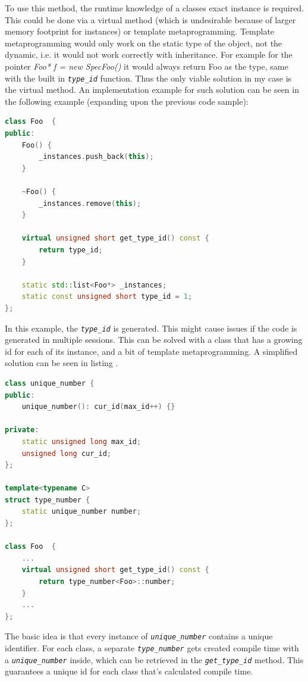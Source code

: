 To use this method, the runtime knowledge of a classes exact instance is
required. This could be done via a virtual method (which is undesirable
because of larger memory footprint for instances) or template metaprogramming.
Template metaprogramming would only work on the static type of the object, not
the dynamic, i.e. it would not work correctly with inheritance. For example for
the pointer \emph{Foo* f = new SpecFoo()} it would always return Foo as the
type, same with the built in \emph{\texttt{type\_id}} function. Thus the only
viable solution in my case is the virtual method. An implementation example for
such solution can be seen in the following example (expanding upon the
previous code sample):

\begin{lstlisting}[frame=single,language=C++, label=listing:type_id,
caption=Type identifier for classes]
class Foo  {
public:
	Foo() {
		_instances.push_back(this);
	}
	
	~Foo() {
		_instances.remove(this);
	}
	
	virtual unsigned short get_type_id() const {
        return type_id;
    }
		
	static std::list<Foo*> _instances;
	static const unsigned short type_id = 1;
};
\end{lstlisting}

In this example, the \emph{\texttt{type\_id}} is generated. This might cause
issues if the code is generated in multiple sessions. This can be solved with a
class that has a growing id for each of its instance, and a bit of template
metaprogramming. A simplified solution can be seen in listing
.

\begin{lstlisting}[frame=single,float=!ht,language=C++,
label=listing:unique_number, caption=Unique number generation for type
identifiers]
class unique_number { 
public:
	unique_number(): cur_id(max_id++) {}

private:
	static unsigned long max_id;
	unsigned long cur_id;
};

template<typename C>
struct type_number {
	static unique_number number;
};

class Foo  {
	...
	virtual unsigned short get_type_id() const {
        return type_number<Foo>::number;
    }
	...
};
\end{lstlisting}

The basic idea is that every instance of \emph{\texttt{unique\_number}} contains
a unique identifier. For each class, a separate \emph{\texttt{type\_number}}
gets created compile time with a \emph{\texttt{unique\_number}} inside, which can be
retrieved in the \emph{\texttt{get\_type\_id}} method. This guarantees a unique
id for each class that's calculated compile time.

